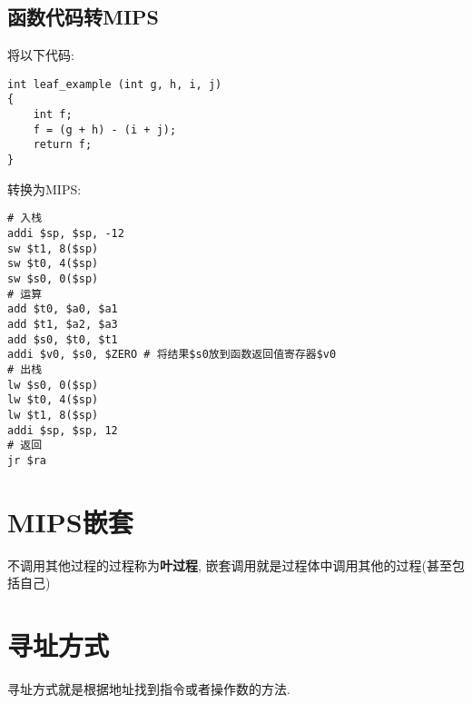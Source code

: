 \subsection{函数代码转MIPS}
将以下代码:
\begin{lstlisting}
int leaf_example (int g, h, i, j)
{
    int f;
    f = (g + h) - (i + j);
    return f;
}
\end{lstlisting}
转换为MIPS:
\begin{lstlisting}
# 入栈
addi $sp, $sp, -12
sw $t1, 8($sp)
sw $t0, 4($sp)
sw $s0, 0($sp)
# 运算
add $t0, $a0, $a1
add $t1, $a2, $a3
add $s0, $t0, $t1
addi $v0, $s0, $ZERO # 将结果$s0放到函数返回值寄存器$v0
# 出栈
lw $s0, 0($sp)
lw $t0, 4($sp)
lw $t1, 8($sp)
addi $sp, $sp, 12
# 返回
jr $ra
\end{lstlisting}
\section{MIPS嵌套}
不调用其他过程的过程称为\textbf{叶过程}, 嵌套调用就是过程体中调用其他的过程(甚至包括自己)
\section{寻址方式}
寻址方式就是根据地址找到指令或者操作数的方法.









